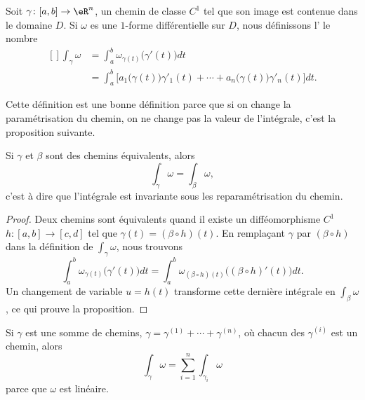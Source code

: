 \begin{definition}
	Soit $\gamma\colon [a,b]\to \eR^n$, un chemin de classe $C^1$ tel que son image est contenue dans le domaine $D$. Si $\omega$ es une $1$-forme différentielle sur $D$, nous définissons l' le nombre
	\begin{equation}
		\begin{aligned}[]
			\int_{\gamma}\omega&=\int_a^b\omega_{\gamma(t)}\big( \gamma'(t) \big)dt\\
				&=\int_a^b\Big[ a_1\big( \gamma(t) \big)\gamma'_1(t)+\cdots +  a_n\big( \gamma(t) \big)\gamma'_n(t) \Big]dt.
		\end{aligned}
	\end{equation}
\end{definition}

Cette définition est une bonne définition parce que si on change la paramétrisation du chemin, on ne change pas la valeur de l'intégrale, c'est la proposition suivante.
\begin{proposition}
	Si $\gamma$ et $\beta$ sont des chemins équivalents, alors
	\begin{equation}
		\int_{\gamma}\omega=\int_{\beta}\omega,
	\end{equation}
	c'est à dire que l'intégrale est invariante sous les reparamétrisation du chemin.
\end{proposition}
\begin{proof}
	Deux chemins sont équivalents quand il existe un difféomorphisme $C^1$ $h\colon [a,b]\to [c,d]$ tel que $\gamma(t)=(\beta\circ h)(t)$. En remplaçant $\gamma$ par $(\beta\circ h)$ dans la définition de $\int_{\gamma}\omega$, nous trouvons
	\begin{equation}
		\int_a^b\omega_{\gamma(t)}\big( \gamma'(t) \big)dt=\int_a^b\omega_{(\beta\circ h)(t)}\big( (\beta\circ h)'(t) \big)dt.
	\end{equation}
	Un changement de variable $u=h(t)$ transforme cette dernière intégrale en $\int_{\beta}\omega$, ce qui prouve la proposition.
\end{proof}

\begin{remark}
	Si $\gamma$ est une somme de chemins, $\gamma=\gamma^{(1)}+\cdots+\gamma^{(n)}$, où chacun des $\gamma^{(i)}$ est un chemin, alors
	\begin{equation}
		\int_{\gamma}\omega=\sum_{i=1}^n\int_{\gamma_i}\omega
	\end{equation}
	parce que $\omega$ est linéaire.
\end{remark}


